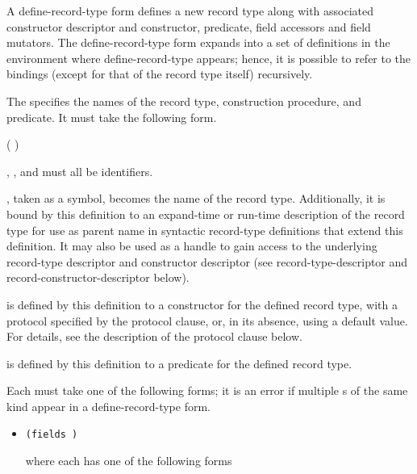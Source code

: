 \begin{entry}{%
}

A {\cf define-record-type} form defines a new record type along with
associated constructor descriptor and constructor, predicate, field
accessors and field mutators. The {\cf define-record-type} form expands into
a set of definitions in the environment where {\cf define-record-type}
appears; hence, it is possible to refer to the bindings (except for
that of the record type itself) recursively.

The  specifies the names of the record type,
construction procedure, and predicate. It must take the following
form.

\begin{scheme}
(  )
\end{scheme}

, , and  must all be identifiers.

, taken as a symbol, becomes the name of the record
type.  Additionally, it is bound by this definition to an expand-time
or run-time description of the record type for use as parent name in
syntactic record-type definitions that extend this definition. It may
also be used as a handle to gain access to the underlying record-type
descriptor and constructor descriptor (see {\cf
  record-type-descriptor} and {\cf record-constructor-descriptor}
below).

 is defined by this definition to a
constructor for the defined record type, with a protocol specified by
the protocol clause, or, in its absence, using a default value. For
details, see the description of the protocol clause below.

 is defined by this definition to a predicate
for the defined record type.

Each  must take one of the following forms; it is
an error if multiple s of the same kind appear in a
{\cf define-record-type} form.

\begin{itemize}
\item {\tt (fields )}
   
  where each  has one of the following forms
  

\end{itemize}
\end{entry}
